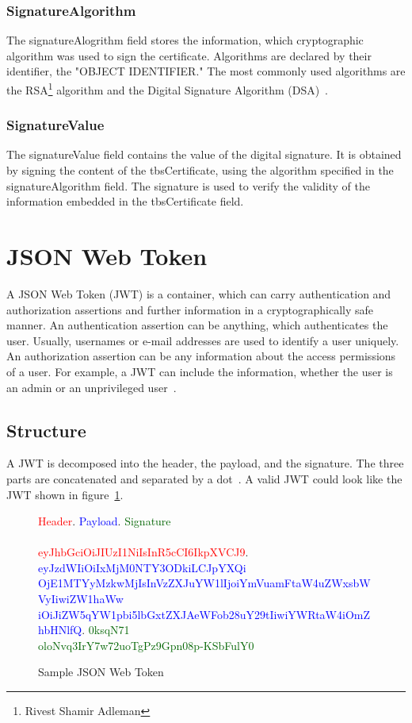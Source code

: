 \subsubsection{SignatureAlgorithm}
The signatureAlogrithm field stores the information, which cryptographic algorithm was used to sign the certificate.
Algorithms are declared by their identifier, the "OBJECT IDENTIFIER." 
The most commonly used algorithms are the RSA\footnote{Rivest Shamir Adleman} algorithm and the Digital Signature Algorithm (DSA)~\cite{x509rfc}.

\subsubsection{SignatureValue}
The signatureValue field contains the value of the digital signature.
It is obtained by signing the content of the tbsCertificate, using the algorithm specified in the signatureAlgorithm field.
The signature is used to verify the validity of the information embedded in the tbsCertificate field.

\section{JSON Web Token}
A JSON Web Token (JWT) is a container, which can carry authentication and authorization assertions and further information in a cryptographically safe manner.
An authentication assertion can be anything, which authenticates the user.
Usually, usernames or e-mail addresses are used to identify a user uniquely.
An authorization assertion can be any information about the access permissions of a user.
For example, a JWT can include the information, whether the user is an admin or an unprivileged user~\cite{dias2020microservices}. 

\subsection{Structure}
A JWT is decomposed into the header, the payload, and the signature.
The three parts are concatenated and separated by a dot~\cite{jwtdocauth0}.
A valid JWT could look like the JWT shown in figure~\ref{fig:myjwt}.
\begin{figure}[H]
    \textcolor{red}{Header}.
	\textcolor{blue}{Payload}.
	\textcolor{darkgreen}{Signature} \\ \\
    \textcolor{red}{eyJhbGciOiJIUzI1NiIsInR5cCI6IkpXVCJ9}.
	\textcolor{blue}{eyJzdWIiOiIxMjM0NTY3ODkiLCJpYXQi\\OjE1MTYyMzkwMjIsInVzZXJuYW1lIjoiYmVuamFtaW4uZWxsbWVyIiwiZW1haWw\\iOiJiZW5qYW1pbi5lbGxtZXJAeWFob28uY29tIiwiYWRtaW4iOmZhbHNlfQ}.
	\textcolor{darkgreen}{0ksqN71\\oloNvq3IrY7w72uoTgPz9Gpn08p-KSbFulY0}
    \caption{Sample JSON Web Token}
    \label{fig:myjwt}
\end{figure}

